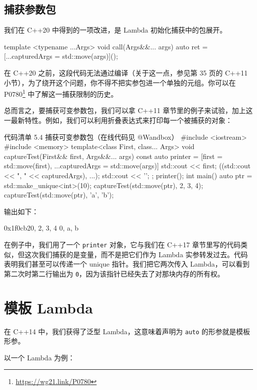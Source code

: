 \subsection{捕获参数包}

我们在 C++20 中得到的一项改进，是 Lambda 初始化捕获中的包展开。

\begin{codebox}
template <typename ...Args> void call(Args&&... args) {
auto ret = [...capturedArgs = std::move(args)](){};
}
\end{codebox}

在 C++20 之前，这段代码无法通过编译（关于这一点，参见第 35 页的 C++11 小节），为了绕开这个问题，你不得不把实参包进一个单独的元组。你可以在 P0780\footnote{\url{https://wg21.link/P0780}} 中了解这一捕获限制的历史。

总而言之，要捕获可变参数包，我们可以拿 C++11 章节里的例子来试验，加上这一最新特性。例如，我们可以利用折叠表达式来打印每一个被捕获的对象：

\begin{codeboxt}{代码清单 5.4 捕获可变参数包（在线代码见 @Wandbox）}
#include <iostream>
#include <memory>
template<class First, class... Args>
void captureTest(First&& first, Args&&... args) {
const auto printer = [first = std::move(first),
...capturedArgs = std::move(args)] {
std::cout << first;
((std::cout << ", " << capturedArgs), ...);
std::cout << '\n';
};
printer();
}
int main() {
auto ptr = std::make_unique<int>(10);
captureTest(std::move(ptr), 2, 3, 4);
captureTest(std::move(ptr), 'a', 'b');
}
\end{codeboxt}

输出如下：

\begin{codebox}
0x1f0cb20, 2, 3, 4
0, a, b
\end{codebox}

在例子中，我们用了一个 \texttt{printer} 对象，它与我们在 C++17 章节里写的代码类似，但这次我们捕获的是变量，而不是把它们作为 Lambda 实参转发过去。代码表明我们甚至可以传递一个 unique 指针。我们把它两次传入 Lambda，可以看到第二次时第二行输出为 \texttt{0}，因为该指针已经失去了对那块内存的所有权。

\section{模板 Lambda}

在 C++14 中，我们获得了泛型 Lambda，这意味着声明为 \texttt{auto} 的形参就是模板形参。

以一个 Lambda 为例：

